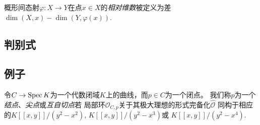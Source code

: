 概形间态射$\varphi:X\to Y$在点$x\in X$的\textit{相对维数}被定义为差
$\dim (X,x)-\dim(Y,\varphi(x))$.

\subsection{判别式}

\subsection{例子}

\begin{defi}\label{defi:5.31}
    令$C\to \operatorname{Spec} K$为一个代数闭域$K$上的曲线，而$p\in C$为一个闭点。
    我们称$p$为一个\textit{结点}、\textit{尖点}或\textit{互自切点}若
    局部环$\mathscr O_{C,p}$关于其极大理想的形式完备化$\hat{\mathscr O}$
    同构于相应的$K[\![x,y]\!]/(y^2-x^2)$, $K[\![x,y]\!]/(y^2-x^3)$或
    $K[\![x,y]\!]/(y^2-x^4)$.
\end{defi}